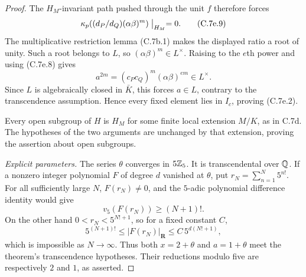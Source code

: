 \begin{proof}
The $H_M$-invariant path pushed through the unit $f$
therefore forces
\[
       \kappa_p\!\left((d_P/d_Q)(\alpha\beta)^m\right)
                                      \bigm|_{H_M}=0.
                                                               \tag{C.7e.9}
\]
The multiplicative restriction lemma (C.7b.1) makes the
displayed ratio a root of unity. Such a root belongs to
$L$, so $(\alpha\beta)^m\in L^\times$.
Raising to the $e$th power and using (C.7e.8) gives
\[
                  a^{2m}=(c_Pc_Q)^m(\alpha\beta)^{em}
                                      \in L^\times.
\]
Since $L$ is algebraically closed in $\bar K$, this
forces $a\in L$, contrary to the transcendence assumption.
Hence every fixed element lies in $I_c$, proving (C.7e.2).

Every open subgroup of $H$ is $H_M$ for some finite local
extension $M/K$, as in C.7d. The hypotheses of the two
arguments are unchanged by that extension, proving the
assertion about open subgroups.

\emph{Explicit parameters.}
The series $\theta$ converges in $5\mathbb Z_5$. It is
transcendental over $\mathbb Q$. If a nonzero integer polynomial
$F$ of degree $d$ vanished at $\theta$, put
$r_N=\sum_{n=1}^N5^{n!}$. For all sufficiently large $N$,
$F(r_N)\ne0$, and the $5$-adic polynomial difference
identity would give
\[
               v_5(F(r_N))\ge (N+1)!.
\]
On the other hand $0<r_N<5^{N!+1}$, so for a fixed
constant $C$,
\[
  5^{(N+1)!}\le |F(r_N)|_{\mathbf R}
                         \le C\,5^{d(N!+1)},
\]
which is impossible as $N\to\infty$.
Thus both $x=2+\theta$ and $a=1+\theta$ meet the theorem's
transcendence hypotheses. Their reductions modulo five
are respectively $2$ and $1$, as asserted.
\end{proof}
